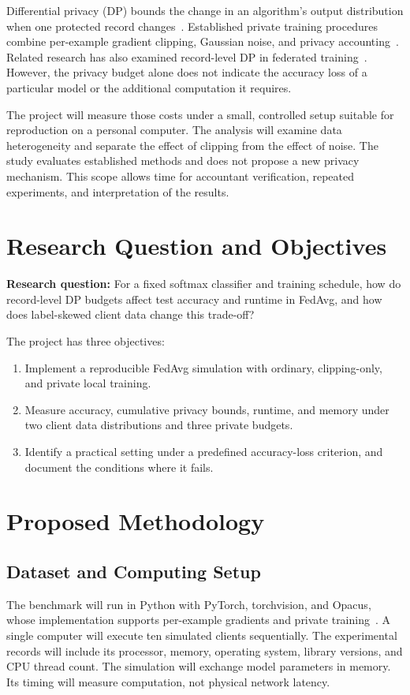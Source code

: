 \documentclass[nolineno]{ieeeaccess}
\begin{document}
Differential privacy (DP) bounds the change in an algorithm's output distribution when one protected record changes~\cite{dwork}. Established private training procedures combine per-example gradient clipping, Gaussian noise, and privacy accounting~\cite{abadi}. Related research has also examined record-level DP in federated training~\cite{zheng}. However, the privacy budget alone does not indicate the accuracy loss of a particular model or the additional computation it requires.

The project will measure those costs under a small, controlled setup suitable for reproduction on a personal computer. The analysis will examine data heterogeneity and separate the effect of clipping from the effect of noise. The study evaluates established methods and does not propose a new privacy mechanism. This scope allows time for accountant verification, repeated experiments, and interpretation of the results.

\section{Research Question and Objectives}
\textbf{Research question:} For a fixed softmax classifier and training schedule, how do record-level DP budgets affect test accuracy and runtime in FedAvg, and how does label-skewed client data change this trade-off?

The project has three objectives:
\begin{enumerate}
  \item Implement a reproducible FedAvg simulation with ordinary, clipping-only, and private local training.
  \item Measure accuracy, cumulative privacy bounds, runtime, and memory under two client data distributions and three private budgets.
  \item Identify a practical setting under a predefined accuracy-loss criterion, and document the conditions where it fails.
\end{enumerate}

\newpage
\section{Proposed Methodology}
\subsection{Dataset and Computing Setup}
The benchmark will run in Python with PyTorch, torchvision, and Opacus, whose implementation supports per-example gradients and private training~\cite{opacus}. A single computer will execute ten simulated clients sequentially. The experimental records will include its processor, memory, operating system, library versions, and CPU thread count. The simulation will exchange model parameters in memory. Its timing will measure computation, not physical network latency.
\end{document}
